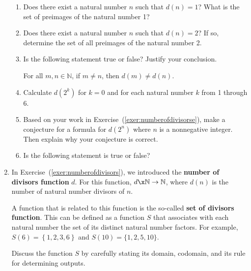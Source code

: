 \begin{enumerate}
\begin{enumerate}
  \item Does there exist a natural number  $n$  such that  $d( n ) = 1$?  What is the set of preimages of the natural number  1?

  \item Does there exist a natural number  $n$  such that  $d( n ) = 2$? If so, determine the set of all preimages of the natural number  2.

  \item Is the following statement true or false?  Justify your conclusion.
  \begin{center}
  For all  $m, n \in \mathbb{N}$, if $m \ne n$, then  $d( m ) \ne d( n )$.
  \end{center}

  \item Calculate  $d\!\left( {2^k } \right)$ for  $k = 0$ and for each natural number  $k$  from  1 through 6.  \label{exer:numberofdivisorse}

  \item Based on your work in Exercise~(\ref{exer:numberofdivisorse}), make a conjecture for a formula for  $d\!\left( {2^n } \right)$ where $n$ is a nonnegative integer.  Then explain why your conjecture is correct.

  \item Is the following statement is true or false?
\end{enumerate}


\item In Exercise~(\ref{exer:numberofdivisors}), %
we introduced the \textbf{number of divisors function}
%
  $d$.  For this function, $d\x \mathbb{N} \to \mathbb{N}$,
where  $d( n )$ is the number of natural number divisors of  $n$.  

A function that is related to this function is the so-called \textbf{set of divisors function}.
%
  This can be defined as a function  $S$  that associates with each natural number the set of its distinct natural number factors.  For example,  
$S( 6 ) = \left\{ {1, 2, 3, 6} \right\}$ and $S(10) = \{1, 2, 5, 10 \}$. \label{exer:sec62-5}

\begin{enumerate}
\yitem Discuss the function  $S$  by carefully stating its domain, codomain, and its rule for determining outputs.


\end{enumerate}
\end{enumerate}
